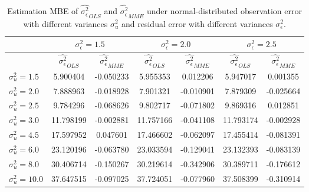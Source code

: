 \documentclass{article}
\begin{document}
\begin{table}[ht]
    \centering
    \caption{Estimation MBE of $\hat{\sigma^2_\epsilon}_{OLS}$ and $\hat{\sigma^2_\epsilon}_{MME}$ under normal-distributed observation error with different variances $\sigma^2_u$ and residual error with different variances $\sigma^2_\epsilon$.}
    \label{Tab:MBE_sigma_normal}
    \begin{tabular}[t]{lcccccc}
        \hline
        &\multicolumn{2}{c}{$\sigma^2_\epsilon=1.5$}&\multicolumn{2}{c}{$\sigma^2_\epsilon=2.0$}&\multicolumn{2}{c}{$\sigma^2_\epsilon=2.5$}\\
        \hline
        &$\hat{\sigma^2_\epsilon}_{OLS}$&$\hat{\sigma^2_\epsilon}_{MME}$&$\hat{\sigma^2_\epsilon}_{OLS}$&
        $\hat{\sigma^2_\epsilon}_{MME}$&$\hat{\sigma^2_\epsilon}_{OLS}$&$\hat{\sigma^2_\epsilon}_{MME}$\\
        \hline
        $\sigma^2_u = 1.5$&5.900404&-0.050233&5.955353&0.012206&5.947017&0.001355\\
        $\sigma^2_u = 2.0$&7.888963&-0.018928&7.901321&-0.010901&7.879309&-0.025664\\
        $\sigma^2_u = 2.5$&9.784296&-0.068626&9.802717&-0.071802&9.869316&0.012851\\
        $\sigma^2_u = 3.0$&11.798199&-0.002881&11.757166&-0.041108&11.793174&-0.002928\\
        $\sigma^2_u = 4.5$&17.597952&0.047601&17.466602&-0.062097&17.455414&-0.081391\\
        $\sigma^2_u = 6.0$&23.120196&-0.063780&23.033594&-0.129041&23.132393&-0.083139\\
        $\sigma^2_u = 8.0$&30.406714&-0.150267&30.219614&-0.342906&30.389711&-0.176612\\
        $\sigma^2_u = 10.0$&37.647515&-0.097025&37.724051&-0.077960&37.508399&-0.310914\\
        \hline
    \end{tabular}
\end{table}
\end{document}
